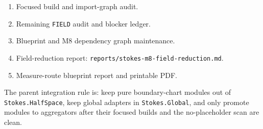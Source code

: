 \begin{proposition}
\begin{enumerate}
      \texttt{MeasureLocalizationAudit} under \texttt{Stokes.Global}.
    \item Focused build and import-graph audit.
    \item Remaining \texttt{FIELD} audit and blocker ledger.
    \item Blueprint and M8 dependency graph maintenance.
    \item Field-reduction report:
      \texttt{reports/stokes-m8-field-reduction.md}.
    \item Measure-route blueprint report and printable PDF.
  \end{enumerate}
  The parent integration rule is: keep pure boundary-chart modules out of
  \texttt{Stokes.HalfSpace}, keep global adapters in \texttt{Stokes.Global},
  and only promote modules to aggregators after their focused builds and the
  no-placeholder scan are clean.
  \par\endgroup
\end{proposition}

